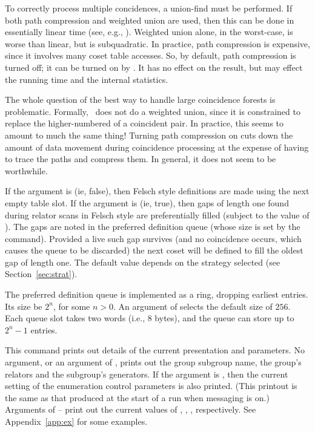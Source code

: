 \quad{}

To correctly process multiple concidences, a union-find must be performed.
If both path compression and weighted union are used, then this can be
  done in essentially linear time (see, e.g., \cite{CLR}).
Weighted union alone, in the worst-case, is worse than linear, but is
  subquadratic.
In practice, path compression is expensive, since it involves many coset
  table accesses.
So, by default, path compression is turned off; it can be turned on by
  .
It has no effect on the result, but may effect the running time and the
  internal statistics.

The whole question of the best way to handle large coincidence forests is
  problematic.
Formally, \ace\ does not do a weighted union, since it is constrained to
  replace the higher-numbered of a coincident pair.
In practice, this seems to amount to much the same thing!
Turning path compression on cuts down the amount of data movement during
  coincidence processing at the expense of having to trace the paths and
  compress them.
In general, it does not seem to be worthwhile.

\quad{}

If the argument is  (ie, false), then Felsch style definitions are 
  made using the next empty table slot.
If the argument is  (ie, true), then gaps of length one found during
  relator scans in Felsch style are preferentially filled (subject to the 
  value of ).
The gaps are noted in the preferred definition queue (whose size is set by
  the  command).  
Provided a live such gap survives (and no coincidence occurs, which causes
  the queue to be discarded) the next coset will be defined to fill the
  oldest gap of length one.
The default value depends on the strategy selected (see 
  Section~\ref{sec:strat}).

\quad{}

The preferred definition queue is implemented as a ring, dropping
  earliest entries.
Its size  be $2^n$\kern-2pt, for some $n>0$.
An argument of  selects the default size of $256$.
Each queue slot takes two words (i.e., 8 bytes), and the queue can store
  up to $2^n-1$ entries.

\quad{}

This command prints out details of the current presentation and parameters.
No argument, or an argument of , prints out the group \amp
  subgroup name, the group's relators and the subgroup's generators.
If the argument is , then the current setting of the enumeration
  control parameters is also printed.
(This printout is the same as that produced at the start of a run when
  messaging is on.)
Arguments of  --  print out the current values of
  , ,  \amp {}, respectively.
See Appendix~\ref{app:ex} for some examples.
 
